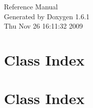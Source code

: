 \documentclass[a4paper]{book}
\begin{document}
\hypersetup{pageanchor=false}
\begin{titlepage}
\vspace*{7cm}
\begin{center}
{\Large Reference Manual}\\
\vspace*{1cm}
{\large Generated by Doxygen 1.6.1}\\
\vspace*{0.5cm}
{\small Thu Nov 26 16:11:32 2009}\\
\end{center}
\end{titlepage}
\clearemptydoublepage
{}
\tableofcontents
\clearemptydoublepage
{}
\hypersetup{pageanchor=true}
\chapter{Class Index}

\chapter{Class Index}

\end{document}

